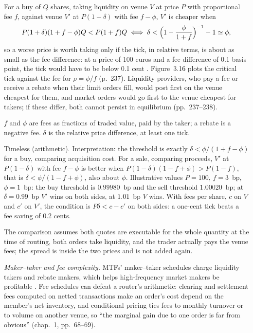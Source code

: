 \begin{qfresult}\label{res:fee-adjusted-venue-choice}
 For a buy of $Q$ shares, taking liquidity on venue $V$ at price $P$ with proportional fee $f$, against venue $V'$ at $P(1+\delta)$ with fee $f-\phi$, $V'$ is cheaper when
\[ P(1+\delta)(1+f-\phi)Q<P(1+f)Q\iff\delta<\Bigl(1-\frac{\phi}{1+f}\Bigr)^{-1}-1\simeq\phi, \]
so a worse price is worth taking only if the tick, in relative terms, is about as small as the fee difference: at a price of 100 euros and a fee difference of 0.1 basis point, the tick would have to be below 0.1 cent \citep[sec.~3.4.2, pp.~236--237]{alpha-laruelle}. Figure~3.16 plots the critical tick against the fee for $\rho=\phi/f$ (p.~237). Liquidity providers, who pay a fee or receive a rebate when their limit orders fill, would post first on the venue cheapest for them, and market orders would go first to the venue cheapest for takers; if these differ, both cannot persist in equilibrium (pp.~237--238).

 $f$ and $\phi$ are fees as fractions of traded value, paid by the taker; a rebate is a negative fee. $\delta$ is the relative price difference, at least one tick.

 Timeless (arithmetic). Interpretation: the threshold is exactly $\delta<\phi/(1+f-\phi)$ for a buy, comparing acquisition cost. For a sale, comparing proceeds, $V'$ at $P(1-\delta)$ with fee $f-\phi$ is better when $P(1-\delta)(1-f+\phi)>P(1-f)$, that is $\delta<\phi/(1-f+\phi)$, also about $\phi$. Illustrative values $P=100$, $f=3$~bp, $\phi=1$~bp: the buy threshold is $0.99980$~bp and the sell threshold $1.00020$~bp; at $\delta=0.99$~bp $V'$ wins on both sides, at $1.01$~bp $V$ wins. With fees per share, $c$ on $V$ and $c'$ on $V'$, the condition is $P\delta<c-c'$ on both sides: a one-cent tick beats a fee saving of 0.2 cents.

The comparison assumes both quotes are executable for the whole quantity at the time of routing, both orders take liquidity, and the trader actually pays the venue fees; the spread is inside the two prices and is not added again.

 \emph{Maker--taker and fee complexity.} MTFs' maker--taker schedules charge liquidity takers and rebate makers, which helps high-frequency market makers be profitable \citep[chap.~1, p.~69; chap.~2, sec.~2.4.3, p.~163]{alpha-laruelle}. Fee schedules can defeat a router's arithmetic: clearing and settlement fees computed on netted transactions make an order's cost depend on the member's net inventory, and conditional pricing ties fees to monthly turnover or to volume on another venue, so ``the marginal gain due to one order is far from obvious'' (chap.~1, pp.~68--69).


\end{qfresult}
